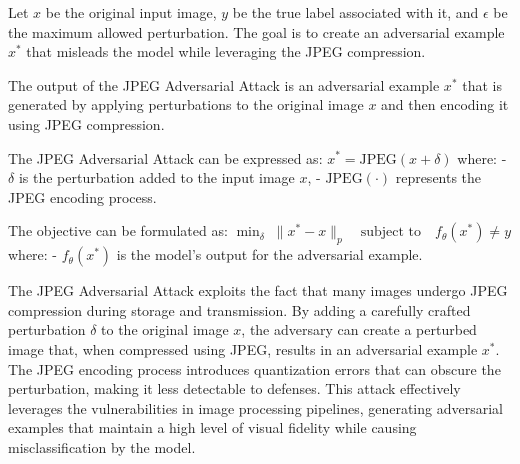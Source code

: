 Let $x$ be the original input image, $y$ be the true label associated with it, and $\epsilon$ be the maximum allowed perturbation. The goal is to create an adversarial example $x^*$ that misleads the model while leveraging the JPEG compression.

The output of the JPEG Adversarial Attack is an adversarial example $x^*$ that is generated by applying perturbations to the original image $x$ and then encoding it using JPEG compression.

The JPEG Adversarial Attack can be expressed as:
$x^* = \text{JPEG}(x + \delta)$
where:
- $\delta$ is the perturbation added to the input image $x$,
- $\text{JPEG}(\cdot)$ represents the JPEG encoding process.

The objective can be formulated as:
$\min_{\delta} \; \|x^* - x\|_p \quad \text{subject to} \quad f_\theta(x^*) \neq y$
where:
- $f_\theta(x^*)$ is the model's output for the adversarial example.

The JPEG Adversarial Attack exploits the fact that many images undergo JPEG compression during storage and transmission. By adding a carefully crafted perturbation $\delta$ to the original image $x$, the adversary can create a perturbed image that, when compressed using JPEG, results in an adversarial example $x^*$. The JPEG encoding process introduces quantization errors that can obscure the perturbation, making it less detectable to defenses. This attack effectively leverages the vulnerabilities in image processing pipelines, generating adversarial examples that maintain a high level of visual fidelity while causing misclassification by the model.

